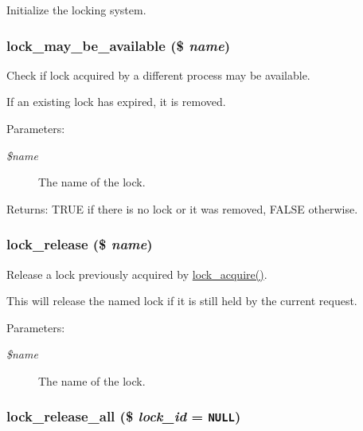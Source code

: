 Initialize the locking system. \hypertarget{group__lock_g095b65838e63b109f52ff6d8c00d8963}{
\subsubsection[{lock\_\-may\_\-be\_\-available}]{\setlength{\rightskip}{0pt plus 5cm}lock\_\-may\_\-be\_\-available (\$ {\em name})}}
\label{group__lock_g095b65838e63b109f52ff6d8c00d8963}


Check if lock acquired by a different process may be available.

If an existing lock has expired, it is removed.

\begin{Desc}
\item[Parameters:]
\begin{description}
\item[{\em \$name}]The name of the lock. \end{description}
\end{Desc}
\begin{Desc}
\item[Returns:]TRUE if there is no lock or it was removed, FALSE otherwise. \end{Desc}
\hypertarget{group__lock_g73e1456861f9aff1a506a650f43aceb0}{
\subsubsection[{lock\_\-release}]{\setlength{\rightskip}{0pt plus 5cm}lock\_\-release (\$ {\em name})}}
\label{group__lock_g73e1456861f9aff1a506a650f43aceb0}


Release a lock previously acquired by \hyperlink{group__lock_gc67a4b1061491f7a869646f47b66e998}{lock\_\-acquire()}.

This will release the named lock if it is still held by the current request.

\begin{Desc}
\item[Parameters:]
\begin{description}
\item[{\em \$name}]The name of the lock. \end{description}
\end{Desc}
\hypertarget{group__lock_g290817e14e2a9ecc0bd34c6b7b0af031}{
\subsubsection[{lock\_\-release\_\-all}]{\setlength{\rightskip}{0pt plus 5cm}lock\_\-release\_\-all (\$ {\em lock\_\-id} = {\tt NULL})}}
\label{group__lock_g290817e14e2a9ecc0bd34c6b7b0af031}


